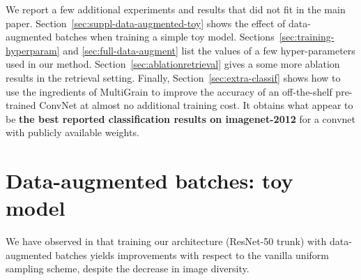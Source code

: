 


We report a few additional experiments and results that did not fit in the main paper. 
Section~\ref{sec:suppl-data-augmented-toy} shows the effect of data-augmented batches when training a simple toy model.
Sections~\ref{sec:training-hyperparam} and \ref{sec:full-data-augment} list the values of a few hyper-parameters used in our method. 
Section~\ref{sec:ablationretrieval} gives a some more ablation results in the retrieval setting.
Finally, Section~\ref{sec:extra-classif} shows how to use the ingredients of MultiGrain to improve the accuracy of an off-the-shelf pre-trained ConvNet at almost no additional training cost. 
It obtains what appear to be \textbf{the best reported classification results on imagenet-2012} for a convnet with publicly available weights. 

%
%
%
%
%
%
%

\section{Data-augmented batches: toy model \label{sec:suppl-data-augmented-toy}}
We have observed in  that training our  architecture (ResNet-50 trunk) with data-augmented batches yields improvements with respect to the vanilla uniform sampling scheme, despite the decrease in  image diversity. 

